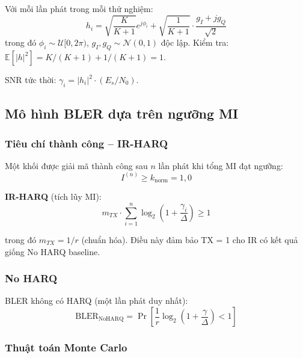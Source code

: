 Với mỗi lần phát trong mỗi thử nghiệm:
\begin{equation}\label{eq:channel_gen}
    h_i = \sqrt{\frac{K}{K+1}} e^{j\phi_i} + \sqrt{\frac{1}{K+1}} \cdot \frac{g_I + jg_Q}{\sqrt{2}}
\end{equation}
trong đó $\phi_i \sim \mathcal{U}[0, 2\pi)$, $g_I, g_Q \sim \mathcal{N}(0,1)$ độc lập. Kiểm tra: $\mathbb{E}[|h|^2] = K/(K+1) + 1/(K+1) = 1$.

SNR tức thời: $\gamma_i = |h_i|^2 \cdot (E_s/N_0)$.

\subsection{Mô hình BLER dựa trên ngưỡng MI}

\subsubsection{Tiêu chí thành công -- IR-HARQ}

Một khối được giải mã thành công sau $n$ lần phát khi tổng MI đạt ngưỡng:
\begin{equation}\label{eq:success_criteria}
    I^{(n)} \geq k_{\text{norm}} = 1{,}0
\end{equation}

\textbf{IR-HARQ} (tích lũy MI):
\begin{equation}\label{eq:ir_success}
    m_{TX} \cdot \sum_{i=1}^{n} \log_2\!\left(1 + \frac{\gamma_i}{\Delta}\right) \geq 1
\end{equation}

trong đó $m_{TX} = 1/r$ (chuẩn hóa). Điều này đảm bảo TX = 1 cho IR có kết quả giống No HARQ baseline.

\subsubsection{No HARQ}

BLER không có HARQ (một lần phát duy nhất):
\begin{equation}\label{eq:no_harq}
    \text{BLER}_{\text{NoHARQ}} = \Pr\!\left[\frac{1}{r}\log_2\!\left(1+\frac{\gamma}{\Delta}\right) < 1\right]
\end{equation}

\subsubsection{Thuật toán Monte Carlo}

